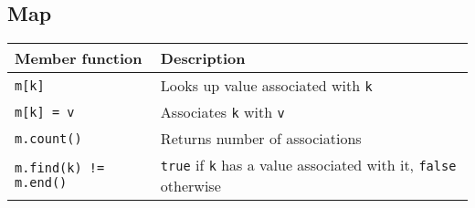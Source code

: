 \subsection{Map}

\begin{center}
  \begin{tabular}{ll}
    \textbf{Member function} & \textbf{Description} \\
    \toprule
    \verb'm[k]' & Looks up value associated with \verb'k' \\
    \verb'm[k] = v' & Associates \verb'k' with \verb'v' \\
    \verb'm.count()' & Returns number of associations \\
    \verb'm.find(k) != m.end()' & \verb'true' if \verb'k' has a value associated with it, \verb'false' otherwise \\
  \end{tabular}
\end{center}


